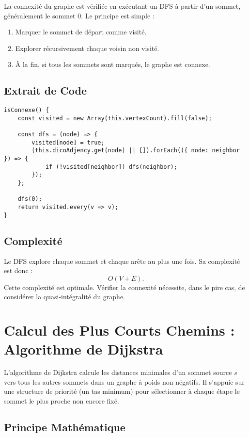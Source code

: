 \documentclass[a4paper,12pt]{article}
\begin{document}
La connexité du graphe est vérifiée en exécutant un DFS à partir d’un sommet, généralement le sommet $0$. Le principe est simple :
\begin{enumerate}
    \item Marquer le sommet de départ comme visité.
    \item Explorer récursivement chaque voisin non visité.
    \item À la fin, si tous les sommets sont marqués, le graphe est connexe.
\end{enumerate}

\subsection{Extrait de Code}

\begin{verbatim}
isConnexe() {
    const visited = new Array(this.vertexCount).fill(false);

    const dfs = (node) => {
        visited[node] = true;
        (this.dicoAdjency.get(node) || []).forEach(({ node: neighbor }) => {
            if (!visited[neighbor]) dfs(neighbor);
        });
    };

    dfs(0);
    return visited.every(v => v);
}
\end{verbatim}

\subsection{Complexité}

Le DFS explore chaque sommet et chaque arête au plus une fois. Sa complexité est donc :
\[
O(V+E).
\]
Cette complexité est optimale. Vérifier la connexité nécessite, dans le pire cas, de considérer la quasi-intégralité du graphe.

\section{Calcul des Plus Courts Chemins : Algorithme de Dijkstra}

L'algorithme de Dijkstra calcule les distances minimales d’un sommet source $s$ vers tous les autres sommets dans un graphe à poids non négatifs. Il s’appuie sur une structure de priorité (un tas minimum) pour sélectionner à chaque étape le sommet le plus proche non encore fixé.

\subsection{Principe Mathématique}
\end{document}
